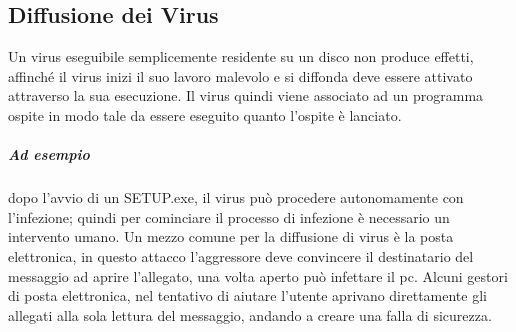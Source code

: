 \subsection{Diffusione dei Virus}
Un virus eseguibile semplicemente residente su un disco non produce effetti, affinché il virus inizi il suo lavoro malevolo e si diffonda deve essere attivato attraverso la sua esecuzione. Il virus quindi viene associato ad un programma ospite in modo tale da essere eseguito quanto l'ospite è lanciato.
\subparagraph{Ad esempio} dopo l'avvio di un SETUP.exe, il virus può procedere autonomamente con l'infezione; quindi per cominciare il processo di infezione è necessario un intervento umano.
\newline
Un mezzo comune per la diffusione di virus è la posta elettronica, in questo attacco l'aggressore deve convincere il destinatario del messaggio ad aprire l'allegato, una volta aperto può infettare il pc.
Alcuni gestori di posta elettronica, nel tentativo di aiutare l'utente aprivano direttamente gli allegati alla sola lettura del messaggio, andando a creare una falla di sicurezza.

